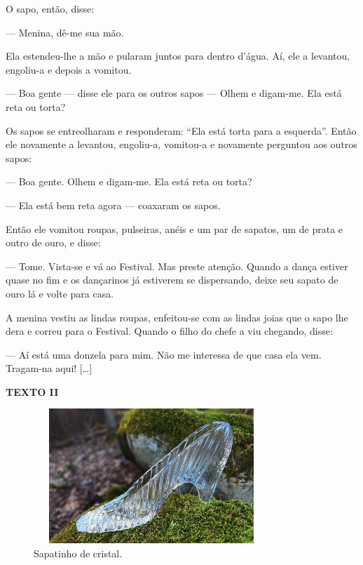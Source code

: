 \begin{myquote}
O sapo, então, disse:

— Menina, dê-me sua mão. 

Ela estendeu-lhe a mão e pularam juntos para dentro d'água. Aí, ele a levantou, engoliu-a e depois a vomitou.

— Boa gente — disse ele para os outros sapos — Olhem e digam-me. Ela
está reta ou torta? 

Os sapos se entreolharam e responderam: ``Ela está
torta para a esquerda''. Então ele novamente a levantou, engoliu-a,
vomitou-a e novamente perguntou aos outros sapos:

— Boa gente. Olhem e digam-me. Ela está reta ou torta?

— Ela está bem reta agora — coaxaram os sapos.

Então ele vomitou roupas, pulseiras, anéis e um par de sapatos, um de
prata e outro de ouro, e disse:

— Tome. Vista-se e vá ao Festival. Mas preste atenção. Quando a dança
estiver quase no fim e os dançarinos já estiverem se dispersando, deixe
seu sapato de ouro lá e volte para casa.

A menina vestiu as lindas roupas, enfeitou-se com as lindas joias que o
sapo lhe dera e correu para o Festival. Quando o filho do chefe a viu
chegando, disse:

— Aí está uma donzela para mim. Não me interessa de que casa ela vem.
Tragam-na aqui! {[}\ldots{}{]}

\end{myquote}

\begin{myquote}
\begin{center}
\textbf{TEXTO II}
\end{center}

\begin{figure}[H]
\centering\includegraphics[width=3.5in,height=2in]{./imgSAEB_6_POR/media/image9b.jpeg}
\caption{Sapatinho de cristal.}
\end{figure}
\end{myquote}

